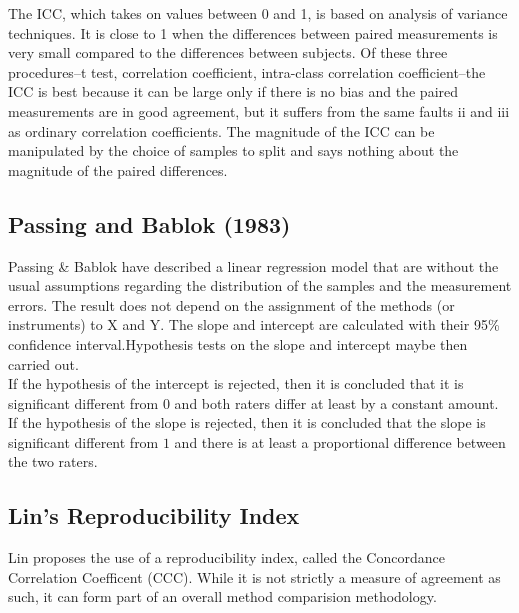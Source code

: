 \documentclass[12pt, a4paper]{report}
\theoremstyle{plain}
\theoremstyle{definition}
\theoremstyle{remark}
\begin{document}
	The ICC, which takes on values between 0 and 1, is based on analysis of variance techniques. It is close to 1 when the differences between paired measurements is very small compared to the differences between subjects. Of these three procedures--t test, correlation coefficient, intra-class correlation coefficient--the ICC is best because it can be large only if there is no bias and the paired measurements are in good agreement, but it suffers from the same faults ii and iii as ordinary correlation coefficients. The magnitude of the ICC can be manipulated by the choice of samples to split and says nothing about the magnitude of the paired differences.
	
	
	
	
	
	
	\subsection{Passing and Bablok (1983) }
	Passing \& Bablok have described a linear regression model that
	are without the usual assumptions regarding the distribution of
	the samples and the measurement errors. The result does not depend
	on the assignment of the methods (or instruments) to X and Y. The
	slope and intercept  are calculated with their 95\% confidence
	interval.Hypothesis tests on the slope and intercept maybe then
	carried out.
	\\
	If the hypothesis of the intercept is rejected, then it is
	concluded that it is significant different from $0$ and both
	raters differ at least by a constant amount.
	\\
	If the hypothesis of the slope is rejected, then it is concluded
	that the slope is significant different from $1$ and there is at
	least a proportional difference between the two raters.
	
	\subsection{Lin's Reproducibility Index} Lin proposes the use of a
	reproducibility index, called the Concordance Correlation
	Coefficent (CCC). While it is not strictly a measure of agreement
	as such, it can form part of an overall method comparision
	methodology.

\end{document}

